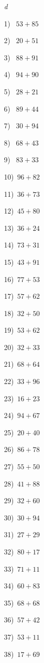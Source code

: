 \documentclass{article}
\begin{document}
 
\begin{center} 
   \large{\textit{d}} 
\end{center}\begin{multicols}{2}
1)$\,\,\,\,\,53+85$ \par 
2)$\,\,\,\,\,20+51$ \par 
3)$\,\,\,\,\,88+91$ \par 
4)$\,\,\,\,\,94+90$ \par 
5)$\,\,\,\,\,28+21$ \par 
6)$\,\,\,\,\,89+44$ \par 
7)$\,\,\,\,\,30+94$ \par 
8)$\,\,\,\,\,68+43$ \par 
9)$\,\,\,\,\,83+33$ \par 
10)$\,\,\,96+82$ \par 
11)$\,\,\,36+73$ \par 
12)$\,\,\,45+80$ \par 
13)$\,\,\,36+24$ \par 
14)$\,\,\,73+31$ \par 
15)$\,\,\,43+91$ \par 
16)$\,\,\,77+53$ \par 
17)$\,\,\,57+62$ \par 
18)$\,\,\,32+50$ \par 
19)$\,\,\,53+62$ \par 
20)$\,\,\,32+33$ \par 
21)$\,\,\,68+64$ \par 
22)$\,\,\,33+96$ \par 
23)$\,\,\,16+23$ \par 
24)$\,\,\,94+67$ \par 
25)$\,\,\,20+40$ \par 
26)$\,\,\,86+78$ \par 
27)$\,\,\,55+50$ \par 
28)$\,\,\,41+88$ \par 
29)$\,\,\,32+60$ \par 
30)$\,\,\,30+94$ \par 
31)$\,\,\,27+29$ \par 
32)$\,\,\,80+17$ \par 
33)$\,\,\,71+11$ \par 
34)$\,\,\,60+83$ \par 
35)$\,\,\,68+68$ \par 
36)$\,\,\,57+42$ \par 
37)$\,\,\,53+11$ \par 
38)$\,\,\,17+69$ \par 

\end{multicols}
\end{document}
